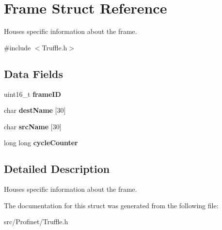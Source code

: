 \hypertarget{struct_frame}{}\section{Frame Struct Reference}
\label{struct_frame}


Houses specific information about the frame.  




{\ttfamily \#include $<$Truffle.\+h$>$}

\subsection*{Data Fields}
\begin{DoxyCompactItemize}
\item 
\hypertarget{struct_frame_a3167f81dde5c4ed242144d0e36d3e4b9}{}uint16\+\_\+t {\bfseries frame\+I\+D}\label{struct_frame_a3167f81dde5c4ed242144d0e36d3e4b9}

\item 
\hypertarget{struct_frame_abe6dedff4e4c79805082000e56a7707b}{}char {\bfseries dest\+Name} \mbox{[}30\mbox{]}\label{struct_frame_abe6dedff4e4c79805082000e56a7707b}

\item 
\hypertarget{struct_frame_ae75f7c4ffa15acfdb02104e20cad4ed2}{}char {\bfseries src\+Name} \mbox{[}30\mbox{]}\label{struct_frame_ae75f7c4ffa15acfdb02104e20cad4ed2}

\item 
\hypertarget{struct_frame_a1dc17f9f9d892cec2bcac8027d0bc8cf}{}long long {\bfseries cycle\+Counter}\label{struct_frame_a1dc17f9f9d892cec2bcac8027d0bc8cf}

\end{DoxyCompactItemize}


\subsection{Detailed Description}
Houses specific information about the frame. 

The documentation for this struct was generated from the following file\+:\begin{DoxyCompactItemize}
\item 
src/\+Profinet/Truffle.\+h\end{DoxyCompactItemize}
